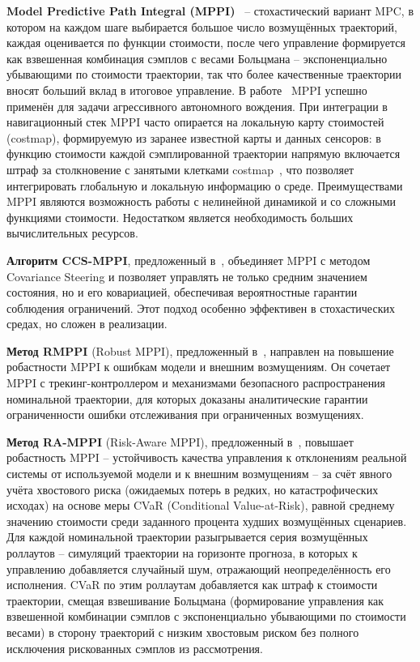 \documentclass[a4paper,12pt]{extarticle}
\begin{document}
    \textbf{Model Predictive Path Integral (MPPI)}~\cite{mppis} -- стохастический вариант MPC,
    в котором на каждом шаге выбирается большое число возмущённых траекторий, каждая оценивается по функции стоимости,
    после чего управление формируется как взвешенная комбинация сэмплов с весами Больцмана --
    экспоненциально убывающими по стоимости траектории, так что более качественные траектории вносят больший вклад
    в итоговое управление.
    В работе~\cite{mppi} MPPI успешно применён для задачи агрессивного автономного вождения.
    При интеграции в навигационный стек MPPI часто опирается на локальную карту стоимостей (costmap),
    формируемую из заранее известной карты и данных сенсоров: в функцию стоимости
    каждой сэмплированной траектории напрямую включается штраф за столкновение
    с занятыми клетками costmap~\cite{mppi_with_map}, что позволяет интегрировать глобальную
    и локальную информацию о среде.
    Преимуществами MPPI являются возможность работы с нелинейной динамикой
    и со сложными функциями стоимости.
    Недостатком является необходимость больших вычислительных ресурсов.

    \textbf{Алгоритм CCS-MPPI}, предложенный в~\cite{ccsmppi}, объединяет MPPI с методом Covariance Steering и
    позволяет управлять не только средним значением состояния, но и его ковариацией,
    обеспечивая вероятностные гарантии соблюдения ограничений.
    Этот подход особенно эффективен в стохастических средах, но сложен в реализации.

    \textbf{Метод RMPPI} (Robust MPPI), предложенный в~\cite{rmppi}, направлен на повышение робастности MPPI к ошибкам модели и внешним возмущениям.
    Он сочетает MPPI с трекинг-контроллером и механизмами безопасного распространения номинальной траектории, для которых доказаны аналитические гарантии ограниченности ошибки отслеживания при ограниченных возмущениях.

    \textbf{Метод RA-MPPI} (Risk-Aware MPPI), предложенный в~\cite{ra_mppi}, повышает робастность MPPI -- устойчивость качества управления к отклонениям реальной системы от используемой модели и к внешним возмущениям -- за счёт явного учёта хвостового риска (ожидаемых потерь в редких, но катастрофических исходах) на основе меры CVaR (Conditional Value-at-Risk), равной среднему значению стоимости среди заданного процента худших возмущённых сценариев.
    Для каждой номинальной траектории разыгрывается серия возмущённых роллаутов -- симуляций траектории на горизонте прогноза, в которых к управлению добавляется случайный шум, отражающий неопределённость его исполнения.
    CVaR по этим роллаутам добавляется как штраф к стоимости траектории,
    смещая взвешивание Больцмана (формирование управления как взвешенной комбинации сэмплов с экспоненциально убывающими по стоимости весами) в сторону траекторий с низким хвостовым риском
    без полного исключения рискованных сэмплов из рассмотрения.
\end{document}
